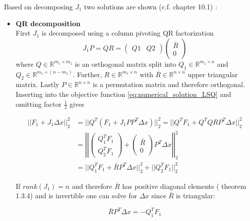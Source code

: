 \documentclass{scrartcl}[12pt, halfparskip]
\numberwithin{equation}{section}
\numberwithin{figure}{section}
\numberwithin{table}{section}
\begin{document}
Based on decomposing $J_1$ two solutions are shown (c.f. \cite{nonlinear_optimiziation_wright} chapter 10.1) :

\begin{itemize}
	\item \textbf{QR decomposition} \\
	First $J_1$ is decomposed using a column pivoting QR factorization
	\begin{equation}
		J_1 P = Q R = 
		\begin{pmatrix}
			Q1 & Q2
		\end{pmatrix}
		\begin{pmatrix}
			\bar{R} \\
			0
		\end{pmatrix}
	\end{equation}
	where $Q \in \mathbb{R}^{m_1 \times m_1}$ is an orthogonal matrix split into $Q_1 \in \mathbb{R}^{m_1 \times n}$ and $Q_2 \in \mathbb{R}^{m_1 \times (n-m_1)}$. Further, $R \in \mathbb{R}^{m_1 \times n}$ with $\bar{R} \in \mathbb{R}^{n \times n}$ upper triangular matrix. Lastly $P \in \mathbb{R}^{n \times n}$ is a permutation matrix and therefore orthogonal. Inserting into the objective function \cref{eq:numerical_solution_LSQ} and omitting factor $\frac{1}{2}$ gives
	
	\begin{align}
		|| F_1 + J_1 \Delta x ||_2^2 & = || Q^T (F_1 + J_1 P P^T \Delta x) ||_2^2 = || Q^T F_1 + Q^T Q R P^T \Delta x ||_2^2 \\
		& = \left| \left| \begin{pmatrix}
		Q_1^T F_1 \\
		Q_2^T F_1
		\end{pmatrix} + 
		\begin{pmatrix}
		\bar{R} \\
		0
		\end{pmatrix}
		P^T \Delta x \right| \right|_2^2 \nonumber \\
		& = || Q_1^T F_1 + \bar{R} P^T \Delta x ||_2^2 + ||Q_2^T F_1 ||_2^2 \nonumber
	\end{align}
	
	If $rank(J_1)=n$ and therefore $\bar{R}$ has positive diagonal elements (\cite{numerical_methods_lsq_Bjorck} theorem 1.3.4) and is invertible  one can solve for $\Delta x$ since $\bar{R}$ is triangular:
	
	\begin{equation}
		\bar{R} P^T \Delta x = -Q_1^T F_1
	\end{equation}
	

\end{itemize}
\end{document}
